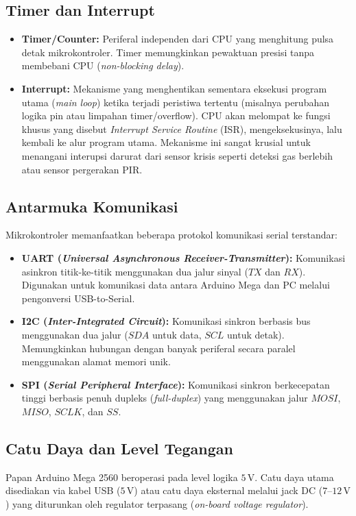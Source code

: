 \subsection{Timer dan Interrupt}
\begin{itemize}
	\item \textbf{Timer/Counter:} Periferal independen dari CPU yang menghitung pulsa detak mikrokontroler. Timer memungkinkan pewaktuan presisi tanpa membebani CPU (\textit{non-blocking delay}).
	\item \textbf{Interrupt:} Mekanisme yang menghentikan sementara eksekusi program utama (\textit{main loop}) ketika terjadi peristiwa tertentu (misalnya perubahan logika pin atau limpahan timer/overflow). CPU akan melompat ke fungsi khusus yang disebut \textit{Interrupt Service Routine} (ISR), mengeksekusinya, lalu kembali ke alur program utama. Mekanisme ini sangat krusial untuk menangani interupsi darurat dari sensor krisis seperti deteksi gas berlebih atau sensor pergerakan PIR.
\end{itemize}

\subsection{Antarmuka Komunikasi}
Mikrokontroler memanfaatkan beberapa protokol komunikasi serial terstandar:
\begin{itemize}
	\item \textbf{UART (\textit{Universal Asynchronous Receiver-Transmitter}):} Komunikasi asinkron titik-ke-titik menggunakan dua jalur sinyal ($TX$ dan $RX$). Digunakan untuk komunikasi data antara Arduino Mega dan PC melalui pengonversi USB-to-Serial.
	\item \textbf{I2C (\textit{Inter-Integrated Circuit}):} Komunikasi sinkron berbasis bus menggunakan dua jalur ($SDA$ untuk data, $SCL$ untuk detak). Memungkinkan hubungan dengan banyak periferal secara paralel menggunakan alamat memori unik.
	\item \textbf{SPI (\textit{Serial Peripheral Interface}):} Komunikasi sinkron berkecepatan tinggi berbasis penuh dupleks (\textit{full-duplex}) yang menggunakan jalur $MOSI$, $MISO$, $SCLK$, dan $SS$.
\end{itemize}

\subsection{Catu Daya dan Level Tegangan}
Papan Arduino Mega 2560 beroperasi pada level logika $5\,\text{V}$. Catu daya utama disediakan via kabel USB ($5\,\text{V}$) atau catu daya eksternal melalui jack DC ($7\text{--}12\,\text{V}$) yang diturunkan oleh regulator terpasang (\textit{on-board voltage regulator}).

